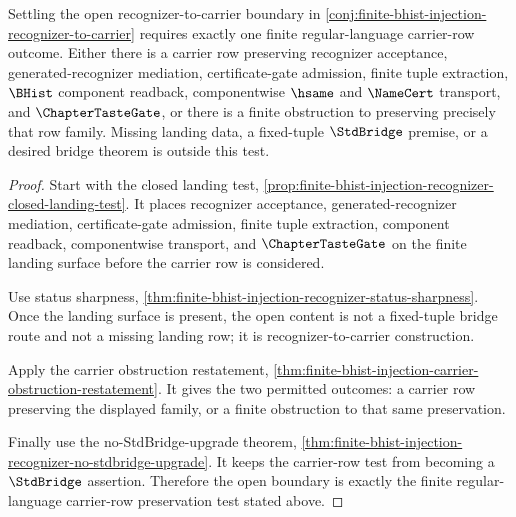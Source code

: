 \begin{theorem}
\label{thm:regular-language-carrier-row}
Settling the open recognizer-to-carrier boundary in \autoref{conj:finite-bhist-injection-recognizer-to-carrier} requires exactly one finite regular-language carrier-row outcome. Either there is a carrier row preserving recognizer acceptance, generated-recognizer mediation, certificate-gate admission, finite tuple extraction, $\BHist$ component readback, componentwise $\hsame$ and $\NameCert$ transport, and $\ChapterTasteGate$, or there is a finite obstruction to preserving precisely that row family. Missing landing data, a fixed-tuple $\StdBridge$ premise, or a desired bridge theorem is outside this test.
\end{theorem}
\begin{proof}
Start with the closed landing test, \autoref{prop:finite-bhist-injection-recognizer-closed-landing-test}. It places recognizer acceptance, generated-recognizer mediation, certificate-gate admission, finite tuple extraction, component readback, componentwise transport, and $\ChapterTasteGate$ on the finite landing surface before the carrier row is considered.

Use status sharpness, \autoref{thm:finite-bhist-injection-recognizer-status-sharpness}. Once the landing surface is present, the open content is not a fixed-tuple bridge route and not a missing landing row; it is recognizer-to-carrier construction.

Apply the carrier obstruction restatement, \autoref{thm:finite-bhist-injection-carrier-obstruction-restatement}. It gives the two permitted outcomes: a carrier row preserving the displayed family, or a finite obstruction to that same preservation.

Finally use the no-StdBridge-upgrade theorem, \autoref{thm:finite-bhist-injection-recognizer-no-stdbridge-upgrade}. It keeps the carrier-row test from becoming a $\StdBridge$ assertion. Therefore the open boundary is exactly the finite regular-language carrier-row preservation test stated above.
\end{proof}

